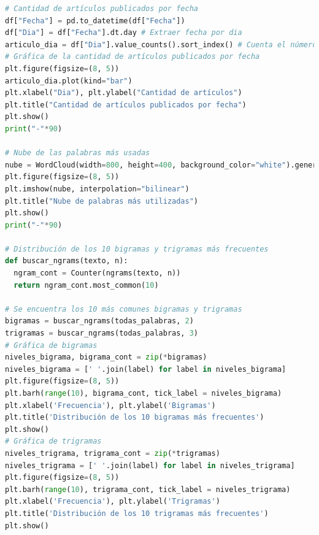\begin{lstlisting}[language=Python]
# Cantidad de artículos publicados por fecha
df["Fecha"] = pd.to_datetime(df["Fecha"])
df["Dia"] = df["Fecha"].dt.day # Extraer fecha por dia
articulo_dia = df["Dia"].value_counts().sort_index() # Cuenta el número de enunciados publicados por dia
# Gráfica de la cantidad de artículos publicados por fecha
plt.figure(figsize=(8, 5))
articulo_dia.plot(kind="bar")
plt.xlabel("Dia"), plt.ylabel("Cantidad de artículos")
plt.title("Cantidad de artículos publicados por fecha")
plt.show()
print("-"*90)

# Nube de las palabras más usadas
nube = WordCloud(width=800, height=400, background_color="white").generate(" ".join(todas_palabras))
plt.figure(figsize=(8, 5))
plt.imshow(nube, interpolation="bilinear")
plt.title("Nube de palabras más utilizadas")
plt.show()
print("-"*90)

# Distribución de los 10 bigramas y trigramas más frecuentes
def buscar_ngrams(texto, n):
  ngram_cont = Counter(ngrams(texto, n))
  return ngram_cont.most_common(10)

# Se encuentra los 10 más comunes bigramas y trigramas
bigramas = buscar_ngrams(todas_palabras, 2)
trigramas = buscar_ngrams(todas_palabras, 3)
# Gráfica de bigramas
niveles_bigrama, bigrama_cont = zip(*bigramas)
niveles_bigrama = [' '.join(label) for label in niveles_bigrama]
plt.figure(figsize=(8, 5))
plt.barh(range(10), bigrama_cont, tick_label = niveles_bigrama)
plt.xlabel('Frecuencia'), plt.ylabel('Bigramas')
plt.title('Distribución de los 10 bigramas más frecuentes')
plt.show()
# Gráfica de trigramas
niveles_trigrama, trigrama_cont = zip(*trigramas)
niveles_trigrama = [' '.join(label) for label in niveles_trigrama]
plt.figure(figsize=(8, 5))
plt.barh(range(10), trigrama_cont, tick_label = niveles_trigrama)
plt.xlabel('Frecuencia'), plt.ylabel('Trigramas')
plt.title('Distribución de los 10 trigramas más frecuentes')
plt.show()
\end{lstlisting}

\newpage 


